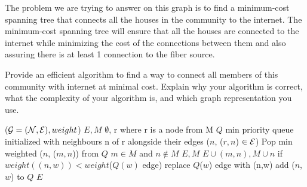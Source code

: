 \begin{problem}
\begin{questions}
The problem we are trying to answer on this graph is to find a minimum-cost spanning tree that connects all the houses in the community to the internet. The minimum-cost spanning tree will ensure that all the houses are connected to the internet while minimizing the cost of the connections between them and also assuring there is at least 1 connection to the fiber source.

\item Provide an efficient algorithm to find a way to connect all members of this community with internet at minimal cost. Explain why your algorithm is correct, what the complexity of your algorithm is, and which graph representation you use.

\begin{myalgo}{($\mathcal{G} = (\mathcal{N}, \mathcal{E}), weight$)}
  \STATE $E, M$ \GETS $\emptyset$, r where r is a node from M
  \STATE $Q$ \GETS min priority queue initialized with neighbours n of r alongside their edges ($n$, ($r,n$) $\in \mathcal{E}$)
    \STATE Pop min weighted ($n$, ($m,n$)) from $Q$ $m \in M$ and $n \notin M$
    \STATE $E, M$ \GETS $E \cup {(m,n)}, M \cup {n}$
        \STATE if $weight((n,w)) < weight$($Q(w)$ edge) replace $Q$($w$) edge with (n,w)
      \ELSE
        \STATE add ($n$, $w$) to $Q$
      \ENDIF
    \ENDFOR
  \ENDWHILE
  \RETURN $E$
\end{myalgo}

\end{questions}
\end{problem}

